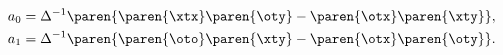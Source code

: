  \begin{equation}
  \begin{split}
    a_{0} &= \Delta^{-1} \paren{\paren{\xtx} \paren{\oty} - \paren{\otx} \paren{\xty} }, \\
    a_{1} &= \Delta^{-1} \paren{\paren{\oto} \paren{\xty} - \paren{\otx}\paren{\oty}}.
  \label{eqn:bevington vector soln}
  \end{split}
  \end{equation}
\endinput  %